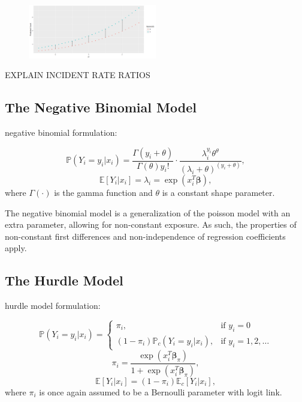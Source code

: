 \documentclass[jou, apacite]{apa6}
\begin{document}
\begin{figure}[h]
\includegraphics[width=0.5\textwidth]{PoissonFirstDiff.png}
\end{figure}
EXPLAIN INCIDENT RATE RATIOS

\subsection{The Negative Binomial Model}

negative binomial formulation:

\begin{equation}
\mathbb{P}(Y_i = y_i | x_i) = \dfrac{\Gamma(y_i + \theta)}{\Gamma(\theta)y_i!}
  \cdot
  \dfrac{\lambda_i^{y_i}\theta^{\theta}}{(\lambda_i + \theta)^{(y_i + \theta)}},
\end{equation}
\begin{equation}
\mathbb{E}[Y_i|x_i] = \lambda_i = \exp (x_i^T \bm{\beta}),
\end{equation}
where $\Gamma(\cdot)$ is the gamma function and $\theta$ is a constant shape parameter.

The negative binomial model is a generalization of the poisson model with an extra parameter, allowing for non-constant exposure. As such, the properties of non-constant first differences and non-independence of regression coefficients apply. 


\subsection{The Hurdle Model}

hurdle model formulation:

\begin{equation}
\mathbb{P}(Y_i = y_i|x_i) =
  \begin{cases}
    \pi_i, & \text{if } y_i = 0 \\
    (1 - \pi_i)\mathbb{P}_c(Y_i = y_i|x_i), & \text{if } y_i = 1, 2, \dots
  \end{cases}
\end{equation}
\begin{equation}
\pi_i = \dfrac{\exp (x_i^T \bm{\beta}_{\pi})}{1 + \exp (x_i^T \bm{\beta}_{\pi})},
\end{equation}
\begin{equation}
\mathbb{E}[Y_i|x_i] = (1 - \pi_i)\mathbb{E}_c[Y_i|x_i], %
\end{equation}
where $\pi_i$ is once again assumed to be a Bernoulli parameter with logit link.
\end{document}
